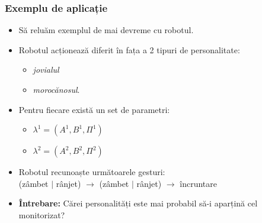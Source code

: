 \begin{frame}
  \frametitle{Exemplu de aplicație}
  \begin{itemize}
    \item Să reluăm exemplul de mai devreme cu robotul.
    \item Robotul acționează diferit în fața a 2 tipuri de personalitate:
      \begin{itemize}
      \item \emph{jovialul}
      \item \emph{morocănosul}.
      \end{itemize}
    \item Pentru fiecare există un set de parametri:
      \begin{itemize}
      \item $\lambda^{1}=(A^{1},B^{1},\Pi^{1})$
      \item $\lambda^{2}=(A^{2},B^{2},\Pi^{2})$
      \end{itemize}
    \item Robotul recunoaște următoarele gesturi:\\
      \alert{(zâmbet $\vert$ rânjet)} $\longrightarrow$ \alert{(zâmbet $\vert$ rânjet)} $\longrightarrow$ \alert{încruntare}%
      \vspace*{1em}
    \item \textbf{Întrebare:} Cărei personalități este mai probabil să-i aparțină cel monitorizat?
  \end{itemize}
\end{frame}

